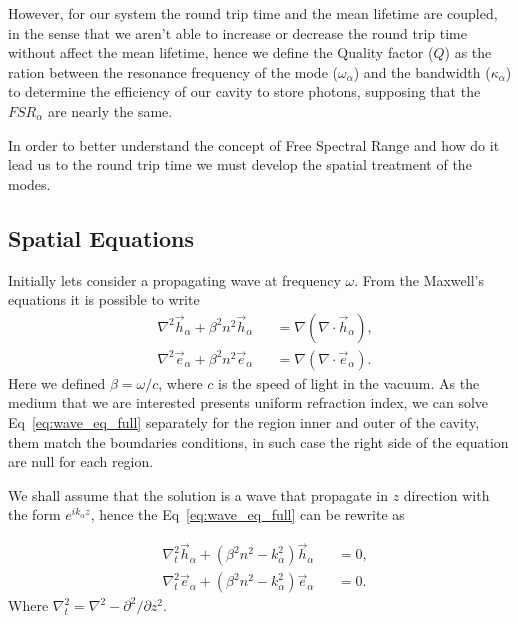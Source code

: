However, for our system the round trip time and the mean lifetime are coupled, in the sense that we aren't able to increase or decrease the round trip time without affect the mean lifetime, hence we define the Quality factor ($Q$) as the ration between the resonance frequency of the mode ($\omega_\alpha$) and the bandwidth ($\kappa_\alpha$) to determine the efficiency of our cavity to store photons, supposing that the $FSR_\alpha$ are nearly the same. 

In order to better understand the concept of Free Spectral Range and how do it lead us to the round trip time we must develop the spatial treatment of the modes. 
\subsection{Spatial Equations}

Initially lets consider a propagating wave at frequency $\omega$. From the Maxwell's equations it is possible to write
\begin{subequations}
    \begin{alignat}{2}
    &\nabla^2\vec{h}_\alpha+\beta^2n^2\vec{h}_\alpha &&= \nabla(\nabla\cdot\vec{h}_\alpha),\\
    &\nabla^2\vec{e}_\alpha+\beta^2n^2\vec{e}_\alpha &&= \nabla(\nabla\cdot\vec{e}_\alpha).
    \end{alignat}
    \label{eq:wave_eq_full}
\end{subequations}
Here we defined $\beta = \omega/c$, where $c$ is the speed of light in the vacuum. As the medium that we are interested presents uniform refraction index, we can solve Eq~\ref{eq:wave_eq_full} separately for the region inner and outer of the cavity, them match the boundaries conditions, in such case the right side of the equation are null for each region. 

We shall assume that the solution is a wave that propagate in $z$ direction with the form $e^{ik_\alpha z}$, hence the Eq~\ref{eq:wave_eq_full} can be rewrite as 

\begin{subequations}
    \begin{alignat}{2}
    &\nabla_t^2\vec{h}_\alpha+(\beta^2n^2-k_\alpha^2)\vec{h}_\alpha &&=0,\\
    &\nabla_t^2\vec{e}_\alpha+(\beta^2n^2-k_\alpha^2)\vec{e}_\alpha &&=0.
    \end{alignat}
    \label{eq:wave_eq}
\end{subequations}
Where $\nabla_t^2 = \nabla^2 - \partial^2/\partial z^2$.

